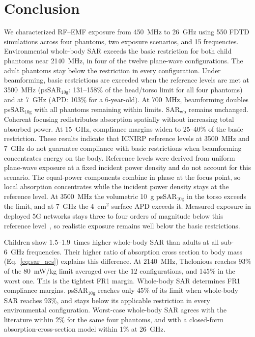 \documentclass{iopjournal}
\begin{document}
\section{Conclusion}
\label{sec:conclusion}

We characterized \gls{RF}--\gls{EMF} exposure from 450~MHz to 26~GHz using 550 \gls{FDTD} simulations across four phantoms, two exposure scenarios, and 15 frequencies.
Environmental whole-body \gls{SAR} exceeds the basic restriction for both child phantoms near 2140~MHz, in four of the twelve plane-wave configurations.
The adult phantoms stay below the restriction in every configuration.
Under beamforming, basic restrictions are exceeded when the reference levels are met at 3500~MHz (psSAR$_{10\mathrm{g}}$: 131--158\% of the head/torso limit for all four phantoms) and at 7~GHz (APD: 103\% for a 6-year-old).
At 700~MHz, beamforming doubles psSAR$_{10\mathrm{g}}$ with all phantoms remaining within limits.
SAR$_\mathrm{wb}$ remains unchanged. Coherent focusing redistributes absorption spatially without increasing total absorbed power.
At 15~GHz, compliance margins widen to 25--40\% of the basic restriction.
These results indicate that \gls{ICNIRP} reference levels at 3500~MHz and 7~GHz do not guarantee compliance with basic restrictions when beamforming concentrates energy on the body.
Reference levels were derived from uniform plane-wave exposure at a fixed incident power density and do not account for this scenario.
The equal-power components combine in phase at the focus point, so local absorption concentrates while the incident power density stays at the reference level.
At 3500~MHz the volumetric 10~g psSAR$_{10\mathrm{g}}$ in the torso exceeds the limit, and at 7~GHz the 4~cm$^2$ surface \gls{APD} exceeds it.
Measured exposure in deployed 5G networks stays three to four orders of magnitude below this reference level~\citep{veludo2025assessing}, so realistic exposure remains well below the basic restrictions.

Children show 1.5--1.9~times higher whole-body \gls{SAR} than adults at all sub-6~GHz frequencies.
Their higher ratio of absorption cross section to body mass (Eq.~\eqref{eq:sar_acs}) explains this difference.
At 2140~MHz, Thelonious reaches 93\% of the 80~mW/kg limit averaged over the 12 configurations, and 145\% in the worst one. This is the tightest FR1 margin.
Whole-body \gls{SAR} determines FR1 compliance margins. psSAR$_{10\mathrm{g}}$ reaches only 45\% of its limit when whole-body \gls{SAR} reaches 93\%, and stays below its applicable restriction in every environmental configuration.
Worst-case whole-body \gls{SAR} agrees with the literature within 2\% for the same four phantoms, and with a closed-form absorption-cross-section model within 1\% at 26~GHz.
\end{document}
